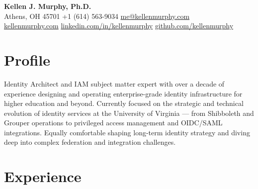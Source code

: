 \documentclass[12pt, letterpaper]{article}
\begin{document}
\begin{center}
  {\LARGE \textbf{Kellen J. Murphy, Ph.D.}} \\[6pt]
  Athens, OH 45701 \quad +1 (614) 563-9034 \quad
  \href{mailto:me@kellenmurphy.com}{me@kellenmurphy.com} \\[2pt]
  \href{https://kellenmurphy.com}{kellenmurphy.com} \quad
  \href{https://linkedin.com/in/kellenmurphy}{linkedin.com/in/kellenmurphy} \quad
  \href{https://github.com/kellenmurphy}{github.com/kellenmurphy}
\end{center}

\vspace{4pt}

\section{Profile}

Identity Architect and IAM subject matter expert with over a decade of experience designing and operating enterprise-grade identity infrastructure for higher education and beyond. Currently focused on the strategic and technical evolution of identity services at the University of Virginia --- from Shibboleth and Grouper operations to privileged access management and OIDC/SAML integrations. Equally comfortable shaping long-term identity strategy and diving deep into complex federation and integration challenges.

\section{Experience}
\end{document}
